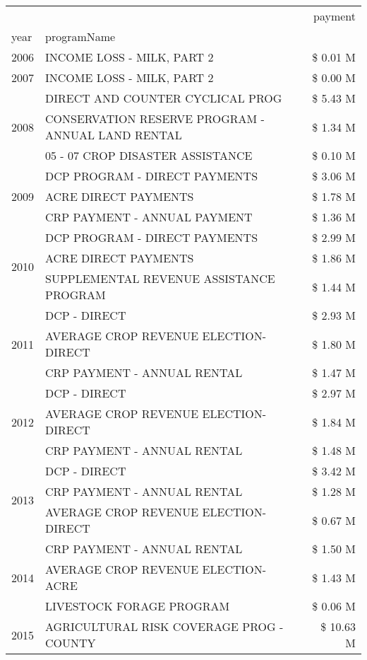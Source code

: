 \begin{tabular}{llr}
\toprule
 &  & payment \\
year & programName &  \\
\midrule
2006 & INCOME LOSS - MILK, PART 2 & \$ 0.01 M \\
\cline{1-3}
2007 & INCOME LOSS - MILK, PART 2 & \$ 0.00 M \\
\cline{1-3}
\multirow[t]{3}{*}{2008} & DIRECT AND COUNTER CYCLICAL PROG & \$ 5.43 M \\
 & CONSERVATION RESERVE PROGRAM - ANNUAL LAND RENTAL & \$ 1.34 M \\
 & 05 - 07 CROP DISASTER ASSISTANCE & \$ 0.10 M \\
\cline{1-3}
\multirow[t]{3}{*}{2009} & DCP PROGRAM - DIRECT PAYMENTS & \$ 3.06 M \\
 & ACRE DIRECT PAYMENTS & \$ 1.78 M \\
 & CRP PAYMENT - ANNUAL PAYMENT & \$ 1.36 M \\
\cline{1-3}
\multirow[t]{3}{*}{2010} & DCP PROGRAM - DIRECT PAYMENTS & \$ 2.99 M \\
 & ACRE DIRECT PAYMENTS & \$ 1.86 M \\
 & SUPPLEMENTAL REVENUE ASSISTANCE PROGRAM & \$ 1.44 M \\
\cline{1-3}
\multirow[t]{3}{*}{2011} & DCP - DIRECT & \$ 2.93 M \\
 & AVERAGE CROP REVENUE ELECTION-DIRECT & \$ 1.80 M \\
 & CRP PAYMENT - ANNUAL RENTAL & \$ 1.47 M \\
\cline{1-3}
\multirow[t]{3}{*}{2012} & DCP - DIRECT & \$ 2.97 M \\
 & AVERAGE CROP REVENUE ELECTION-DIRECT & \$ 1.84 M \\
 & CRP PAYMENT - ANNUAL RENTAL & \$ 1.48 M \\
\cline{1-3}
\multirow[t]{3}{*}{2013} & DCP - DIRECT & \$ 3.42 M \\
 & CRP PAYMENT - ANNUAL RENTAL & \$ 1.28 M \\
 & AVERAGE CROP REVENUE ELECTION-DIRECT & \$ 0.67 M \\
\cline{1-3}
\multirow[t]{3}{*}{2014} & CRP PAYMENT - ANNUAL RENTAL & \$ 1.50 M \\
 & AVERAGE CROP REVENUE ELECTION-ACRE & \$ 1.43 M \\
 & LIVESTOCK FORAGE PROGRAM & \$ 0.06 M \\
\cline{1-3}
\multirow[t]{3}{*}{2015} & AGRICULTURAL RISK COVERAGE PROG - COUNTY & \$ 10.63 M \\

\end{tabular}
